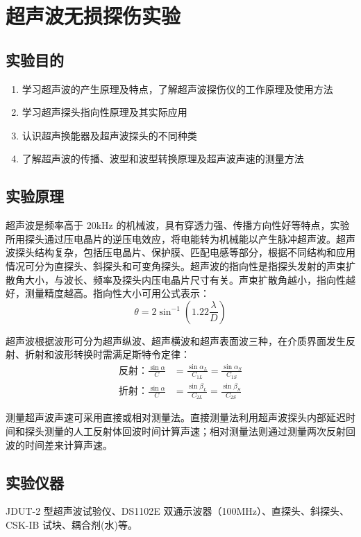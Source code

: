 \chapter{超声波无损探伤实验}
\section{实验目的}
    \begin{enumerate}
        \item 学习超声波的产生原理及特点，了解超声波探伤仪的工作原理及使用方法 
        \item 学习超声探头指向性原理及其实际应用
        \item 认识超声换能器及超声波探头的不同种类
        \item 了解超声波的传播、波型和波型转换原理及超声波声速的测量方法
    \end{enumerate}
\section{实验原理}%
    超声波是频率高于 20kHz 的机械波，具有穿透力强、传播方向性好等特点，实验所用探头通过压电晶片的逆压电效应，将电能转为机械能以产生脉冲超声波。超声波探头结构复杂，包括压电晶片、保护膜、匹配电感等部分，根据不同结构和应用情况可分为直探头、斜探头和可变角探头。超声波的指向性是指探头发射的声束扩散角大小，与波长、频率及探头内压电晶片尺寸有关。声束扩散角越小，指向性越好，测量精度越高。指向性大小可用公式表示：
    \begin{equation}
        \theta=2\sin^{-1}\left(1.22\frac\lambda D\right)
    \end{equation}\par
    超声波根据波形可分为超声纵波、超声横波和超声表面波三种，在介质界面发生反射、折射和波形转换时需满足斯特令定律：
    \begin{equation}
        \begin{aligned}
            \text{反射：}\frac{\sin\alpha}C&=\frac{\sin\alpha_L}{C_{1L}}=\frac{\sin\alpha_S}{C_{1S}}\\
            \text{折射：}\frac{\sin\alpha}C&=\frac{\sin\beta_L}{C_{2L}}=\frac{\sin\beta_S}{C_{2S}}
        \end{aligned}
    \end{equation}\par
    测量超声波声速可采用直接或相对测量法。直接测量法利用超声波探头内部延迟时间和探头测量的人工反射体回波时间计算声速；相对测量法则通过测量两次反射回波的时间差来计算声速。
\section{实验仪器}%
    JDUT-2 型超声波试验仪、DS1102E 双通示波器（100MHz）、直探头、斜探头、CSK-IB 试块、耦合剂(水)等。
